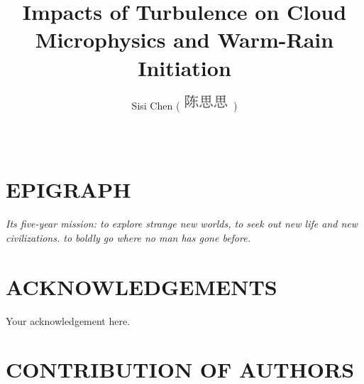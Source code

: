 \documentclass [12pt,letterpaper]{report}
\begin{document}

\title{Impacts of Turbulence on Cloud Microphysics and Warm-Rain Initiation}
\author{Sisi Chen (\includegraphics[width=0.15\textwidth]{Chinese_name.pdf})}
\date{\Month\ \number\year}

\maketitle

\thispagestyle{empty}
\mbox{}
\newpage

\raggedbottom
\onehalfspacing
{}



\doublespacing
\section*{\centering EPIGRAPH}

\begin{center}
\large \emph{Its five-year mission: to explore strange new worlds, to seek out new life and new civilizations. to boldly go where no man has gone before.} 
\end{center}

\newpage
\section*{\centering ACKNOWLEDGEMENTS}

Your acknowledgement here.


\newpage
\section*{\centering CONTRIBUTION OF AUTHORS}
\end{document}

